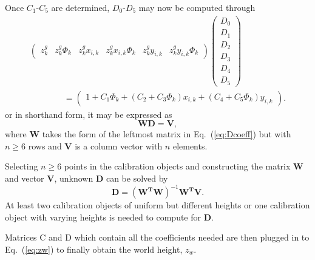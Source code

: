 Once $C_1$-$C_5$ are determined, $D_0$-$D_5$ may now be computed through
\begin{align}
	\begin{pmatrix}
		z^g_k & z^g_k\Phi_k & z^g_k x_{i,k} & z^g_kx_{i,k}\Phi_k & z^g_k y_{i,k} & z^g_k y_{i,k}\Phi_k 
	\end{pmatrix}
	\begin{pmatrix}
		D_0\\D_1\\D_2\\D_3\\D_4\\D_5
	\end{pmatrix}
	\nonumber\\ \qquad \qquad= 
	\begin{pmatrix}
		1 + C_1\Phi_k + (C_2 + C_3\Phi_k)x_{i,k} + (C_4+C_5\Phi_k)y_{i,k}
	\end{pmatrix}
	.
	\label{eq:Dcoeff}
\end{align}
or in shorthand form, it may be expressed as
\begin{equation}
	\mathbf{WD}=\mathbf{V},
	\label{eq:Dcoeffshort}
\end{equation}
where $\mathbf{W}$ takes the form of the leftmost matrix in Eq.~(\ref{eq:Dcoeff}) but with $n\geq6$ rows and $\mathbf{V}$ is a column vector with $n$ elements.

Selecting $n\geq6$ points in the calibration objects and constructing the matrix $\mathbf W$ and vector $\mathbf V$, unknown $\mathbf{D}$ can be solved by
\begin{equation}
	\mathbf{D}=(\mathbf{W^TW})^{-1}\mathbf{W^TV}.
\end{equation}
At least two calibration objects of uniform but different heights or one calibration object with varying heights is needed to compute for $\mathbf{D}$.

Matrices C and D which contain all the coefficients needed are then plugged in to Eq.~(\ref{eq:zw}) to finally obtain the world height, $z_w$.